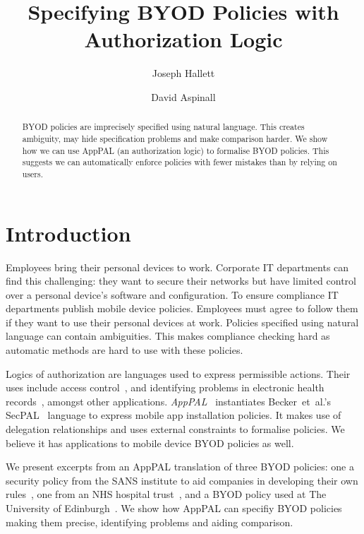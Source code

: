 \documentclass{easychair}
\title{Specifying BYOD Policies with Authorization Logic}
\author{
  Joseph Hallett\inst{1}
  \and
  David Aspinall\inst{1}
}
\institute{
  University of Edinburgh
}
\begin{document}
\maketitle

\begin{abstract}
  BYOD policies are imprecisely specified using natural language.
  This creates ambiguity, may hide specification problems and make comparison harder.
  We show how we can use AppPAL (an authorization logic) to formalise BYOD policies.
  This suggests we can automatically enforce policies with fewer mistakes than by relying on users.
\end{abstract}

\section{Introduction}

Employees bring their personal devices to work.
Corporate IT departments can find this challenging:
  they want to secure their networks but have limited control over a personal device's software and configuration.
To ensure compliance IT departments publish mobile device policies.
Employees must agree to follow them if they want to use their personal devices at work.
Policies specified using natural language can contain ambiguities.
This makes compliance checking hard as automatic methods are hard to use with these policies.

Logics of authorization are languages used to express permissible actions.
Their uses include access control~\cite{Abadi:2003kta}, and identifying problems in electronic health records~\cite{Becker:2004fi}, amongst other applications.
\emph{AppPAL}~\cite{Hallett:2016vu} instantiates Becker~et~al{.}'s SecPAL~\cite{Becker:2006vh} language to express mobile app installation policies.
It makes use of delegation relationships and uses external constraints to formalise policies.
We believe it has applications to mobile device BYOD policies as well.

We present excerpts from an AppPAL translation of three BYOD policies: 
    one a security policy from the SANS institute to aid companies in developing their own rules~\cite{Guerin:2008we}, 
    one from an NHS hospital trust~\cite{Kennington:2014tr},
    and a BYOD policy used at The University of Edinburgh~\cite{Williamson:2015tr}.
We show how AppPAL can specifiy BYOD policies making them precise, identifying problems and aiding comparison.
\end{document}
